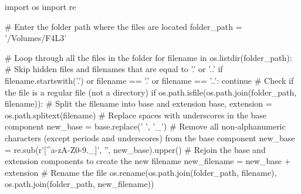 import os
import re

# Enter the folder path where the files are located
folder_path = '/Volumes/F4L3'

# Loop through all the files in the folder
for filename in os.listdir(folder_path):
    # Skip hidden files and filenames that are equal to '.' or '..'
    if filename.startswith('.') or filename == '.' or filename == '..':
        continue
    # Check if the file is a regular file (not a directory)
    if os.path.isfile(os.path.join(folder_path, filename)):
        # Split the filename into base and extension
        base, extension = os.path.splitext(filename)
        # Replace spaces with underscores in the base component
        new_base = base.replace(' ', '_')
        # Remove all non-alphanumeric characters (except periods and underscores) from the base component
        new_base = re.sub(r'[^a-zA-Z0-9._]', '', new_base).upper()
        # Rejoin the base and extension components to create the new filename
        new_filename = new_base + extension
        # Rename the file
        os.rename(os.path.join(folder_path, filename), os.path.join(folder_path, new_filename))
